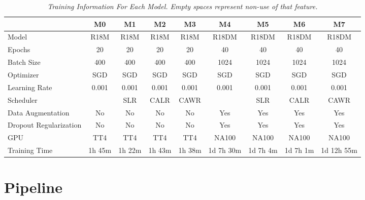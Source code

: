 \begin{landscape}

\begin{table}
\centering
\begin{tabular}{lcccccccc}
    \toprule
 & M0 & M1 & M2 & M3 & M4 & M5 & M6 & M7 \\
 \midrule
 Model & R18M & R18M & R18M & R18M & R18DM & R18DM & R18DM & R18DM \\
Epochs & 20 & 20 & 20 & 20 & 40 & 40 & 40 & 40 \\
Batch Size & 400 & 400 & 400 & 400 & 1024 & 1024 & 1024 & 1024 \\
Optimizer & SGD & SGD & SGD & SGD & SGD & SGD & SGD & SGD \\
Learning Rate & 0.001 & 0.001 & 0.001 & 0.001 & 0.001 & 0.001 & 0.001 & 0.001 \\
Scheduler & & SLR & CALR & CAWR &  & SLR & CALR & CAWR  \\
Data Augmentation & No & No & No & No  & Yes & Yes & Yes & Yes \\
Dropout Regularization & No & No & No & No  & Yes & Yes & Yes & Yes \\
GPU & TT4 & TT4 & TT4 & TT4 & NA100 & NA100 & NA100 & NA100 \\
Training Time & 1h 45m & 1h 22m & 1h 43m & 1h 38m & 1d 7h 30m & 1d 7h 4m & 1d 7h 1m & 1d 12h 55m \\ \bottomrule
\end{tabular}
\caption[Training Information For Each Model.]{\textit{Training Information For Each Model. Empty spaces represent non-use of that feature.}}
{\label{table:trained-models-information}}
\end{table}
\end{landscape}


\newpage

\section{Pipeline}

